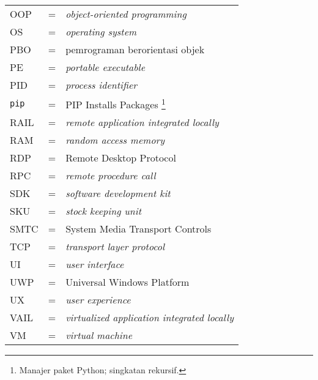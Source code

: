 \begin{longtable}{llp{3in}}
    OOP & \hspace{1.5cm} = & \textit{object-oriented programming}\\
    OS & \hspace{1.5cm} = & \textit{operating system}\\
    PBO & \hspace{1.5cm} = & pemrograman berorientasi objek\\
    PE & \hspace{1.5cm} = & \textit{portable executable}\\
    PID & \hspace{1.5cm} = & \textit{process identifier}\\
    \verb|pip| & \hspace{1.5cm} = & PIP Installs Packages \footnote{Manajer paket Python; singkatan rekursif.}\\
    RAIL & \hspace{1.5cm} = & \textit{remote application integrated locally}\\
    RAM & \hspace{1.5cm} = & \textit{random access memory}\\
    RDP & \hspace{1.5cm} = & Remote Desktop Protocol\\
    RPC & \hspace{1.5cm} = & \textit{remote procedure call}\\
    SDK & \hspace{1.5cm} = & \textit{software development kit}\\
    SKU & \hspace{1.5cm} = & \textit{stock keeping unit}\\
    SMTC & \hspace {1.5cm} = & System Media Transport Controls\\
    TCP & \hspace{1.5cm} = & \textit{transport layer protocol}\\
    UI & \hspace{1.5cm} = & \textit{user interface}\\
    UWP & \hspace{1.5cm} = & Universal Windows Platform\\
    UX & \hspace{1.5cm} = & \textit{user experience}\\
    VAIL & \hspace{1.5cm} = & \textit{virtualized application integrated locally}\\
    VM & \hspace{1.5cm} = & \textit{virtual machine}\\

\end{longtable}
